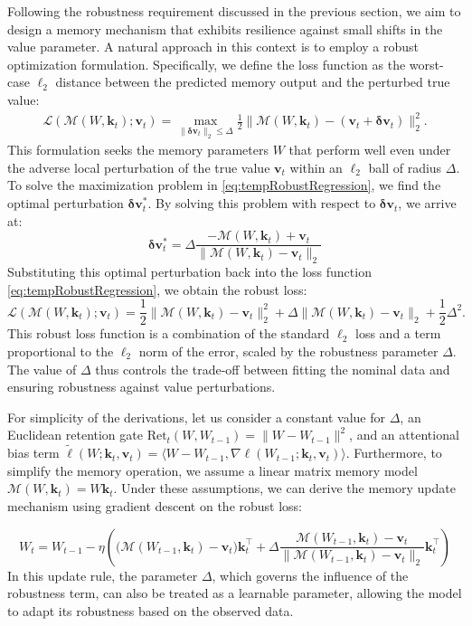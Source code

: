 \documentclass{article}
\newcommand{\vk}[0]{\mathbf{k}}
\newcommand{\vvv}[0]{\mathbf{v}}
\newcommand{\M}[0]{\mathcal{M}}
\theoremstyle{plain}
\theoremstyle{definition}
\theoremstyle{remark}
\newcommand{\head}[1]{\vspace{1.7mm}\noindent{{\textcolor{c2}{\bf #1.}}}}
\begin{document}
\head{Variant 3: Memory Robust to Value Shifts}
Following the robustness requirement discussed in the previous section, we aim to design a memory mechanism that exhibits resilience against small shifts in the value parameter. A natural approach in this context is to employ a robust optimization formulation. Specifically, we define the loss function as the worst-case $\ell_2$ distance between the predicted memory output and the perturbed true value:
\begin{align}
\label{eq:tempRobustRegression}
    \mathcal{L}(\M(W, \vk_t); \vvv_t) = \max_{\|\boldsymbol{\delta} \vvv_t\|_2 \leq \Delta }\frac{1}{2}\| \M(W,\vk_t) - (\vvv_t+\boldsymbol{\delta} \vvv_t) \|_2^2.
\end{align}
This formulation seeks the memory parameters $W$ that perform well even under the  adverse local perturbation of the true value $\mathbf{v}_t$ within an $\ell_2$ ball of radius $\Delta$.
To solve the maximization problem in \eqref{eq:tempRobustRegression}, we find the optimal perturbation $\boldsymbol{\delta}\mathbf{v}_t^*$. By solving this problem with respect to $\boldsymbol{\delta}\mathbf{v}_t$, we arrive at:
\[
\boldsymbol{\delta}\vvv_t^* = \Delta \frac{-\M(W,\vk_t) + \vvv_t}{\|\M(W,\vk_t) - \vvv_t\|_2}
\]
Substituting this optimal perturbation back into the loss function \eqref{eq:tempRobustRegression}, we obtain the robust loss:
\[
\mathcal{L}(\M(W, \vk_t); \vvv_t) = \frac{1}{2}\|\M(W,\vk_t) - \vvv_t\|_2^2 + \Delta \|\M(W,\vk_t) - \vvv_t\|_2 + \frac{1}{2}\Delta^2.
\]
This robust loss function is a combination of the standard $\ell_2$ loss and a term proportional to the $\ell_2$ norm of the error, scaled by the robustness parameter $\Delta$. The value of $\Delta$ thus controls the trade-off between fitting the nominal data and ensuring robustness against value perturbations.

For simplicity of the derivations, let us consider a constant value for $\Delta$, an Euclidean retention gate  $\mbox{Ret}_t\left(W,W_{t-1}\right) = \|W-W_{t-1}\|^2$, and an attentional bias term $\widetilde{\ell}(W;\mathbf{k}_t, \mathbf{v}_t) = \langle W-W_{t-1}, \nabla \ell(W_{t-1};\mathbf{k}_t, \mathbf{v}_t)\rangle$. Furthermore, to simplify the memory operation, we assume a linear matrix memory model $\M(W,\mathbf{k}_t) = W\mathbf{k}_t$. Under these assumptions, we can derive the memory update mechanism using gradient descent on the robust loss:


\[
W_{t} = W_{t-1} - \eta \left( \big(\M(W_{t-1},\vk_t)-\vvv_t\big) \vk_t^\top + \Delta \frac{\M(W_{t-1},\vk_t)-\vvv_t}{\|\M(W_{t-1},\vk_t)-\vvv_t\|_2}\vk_t^\top
\right)
\]
In this update rule, the parameter $\Delta$, which governs the influence of the robustness term, can also be treated as a learnable parameter, allowing the model to adapt its robustness based on the observed data.
\end{document}
